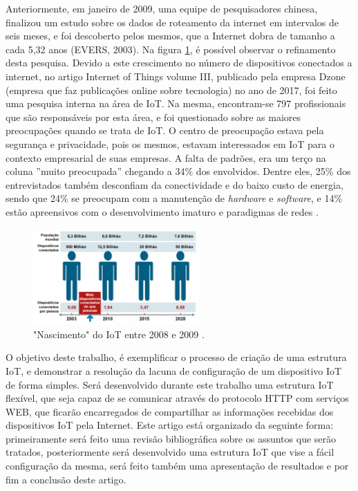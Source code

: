 \documentclass[journal]{IEEEtran}
\begin{document}
Anteriormente, em janeiro de 2009, uma equipe de pesquisadores chinesa, finalizou um estudo sobre os dados de roteamento da internet em intervalos de seis meses, e foi descoberto pelos mesmos, que a Internet dobra de tamanho a cada 5,32 anos (EVERS, 2003). Na figura \ref{fig_um}, é possível observar o refinamento desta pesquisa. Devido a este crescimento no número de dispositivos conectados a internet, no artigo Internet of Things volume III, publicado pela empresa Dzone (empresa que faz publicações online sobre tecnologia) no ano de 2017, foi feito uma pesquisa interna na área de IoT. Na mesma, encontram-se 797 profissionais que são responsáveis por esta área, e foi questionado sobre as maiores preocupações quando se trata de IoT. O centro de preocupação estava pela segurança e privacidade, pois os mesmos, estavam interessados em IoT para o contexto empresarial de suas empresas. A falta de padrões, era um terço na coluna ''muito preocupada'' chegando a 34\% dos envolvidos. Dentre eles, 25\% dos entrevistados também  desconfiam da conectividade e do baixo custo de energia, sendo que 24\% se preocupam com a manutenção de \emph{hardware} e \emph{software}, e 14\% estão apreensivos com o desenvolvimento imaturo e paradigmas de redes \cite[p.~4]{Evans}.

\begin{figure}[H]
\centering
\includegraphics[width=2.5in]{um}
\caption{"Nascimento" do IoT entre 2008 e 2009 \cite{Evans}.}
\label{fig_um}
\end{figure}

O objetivo deste trabalho, é exemplificar o processo de criação de uma estrutura IoT, e demonstrar a resolução da lacuna de configuração de um dispositivo IoT de forma simples. Será desenvolvido durante este trabalho uma estrutura IoT flexível, que seja capaz de se comunicar através do protocolo HTTP com serviços WEB, que ficarão encarregados de compartilhar as informações recebidas dos dispositivos IoT pela Internet. Este artigo está organizado da seguinte forma: primeiramente será feito uma revisão bibliográfica sobre os assuntos que serão tratados, posteriormente será desenvolvido uma estrutura IoT que vise a fácil configuração da mesma, será feito também uma apresentação de resultados e por fim a conclusão deste artigo.
\end{document}
